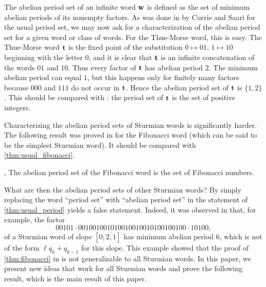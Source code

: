 \documentclass[a4paper,fleqn]{article}
\newcommand{\infw}[1]{%
  \ifcat\noexpand#1\relax\bm{#1}%
  \else\mathbf{#1}\fi}          %
\begin{document}
  The abelian period set of an infinite word $\infw{w}$ is defined as the set of minimum abelian periods of its
  nonempty factors. As was done in \cite{2009:least_periods_of_factors_of_infinite_words} by Currie and Saari for the
  usual period set, we may now ask for a characterization of the abelian period set for a given word or class of words.
  For the Thue-Morse word, this is easy. The Thue-Morse word $\infw{t}$ is the fixed point of the substitution
  $0 \mapsto 01$, $1 \mapsto 10$ beginning with the letter $0$, and it is clear that $\infw{t}$ is an infinite
  concatenation of the words $01$ and $10$. Thus every factor of $\infw{t}$ has abelian period $2$. The minimum abelian
  period can equal $1$, but this happens only for finitely many factors because $000$ and $111$ do not occur in
  $\infw{t}$. Hence the abelian period set of $\infw{t}$ is $\{1, 2\}$. This should be compared with
  \cite[Thm.~2]{2009:least_periods_of_factors_of_infinite_words}: the period set of $\infw{t}$ is the set of positive
  integers.

  Characterizing the abelian period sets of Sturmian words is significantly harder. The following result was proved in
  \cite{2016:abelian_powers_and_repetitions_in_sturmian_words} for the Fibonacci word (which can be said to be the
  simplest Sturmian word). It should be compared with \autoref{thm:usual_fibonacci}.

  \begin{theorem}\label{thm:fibonacci}\cite[Thm.~6.9]{2016:abelian_powers_and_repetitions_in_sturmian_words}, \cite[Thm.~6.12]{2016:abelian_powers_and_repetitions_in_sturmian_words}
    The abelian period set of the Fibonacci word is the set of Fibonacci numbers.
  \end{theorem}

  What are then the abelian period sets of other Sturmian words? By simply replacing the word ``period set'' with
  ``abelian period set'' in the statement of \autoref{thm:usual_period} yields a false statement. Indeed, it was
  observed in \cite[Remark~6.11]{2016:abelian_powers_and_repetitions_in_sturmian_words} that, for example, the factor
  \begin{equation*}
    00101 \cdot 001001001010010010010100100100 \cdot 10100,
  \end{equation*}
  of a Sturmian word of slope $[0;\overline{2,1}]$ has minimum abelian period $6$, which is not of the form
  $\ell q_k + q_{k-1}$ for this slope. This example showed that the proof of \autoref{thm:fibonacci} in
  \cite{2016:abelian_powers_and_repetitions_in_sturmian_words} is not generalizable to all Sturmian words. In this
  paper, we present new ideas that work for all Sturmian words and prove the following result, which is the main result
  of this paper.
\end{document}
